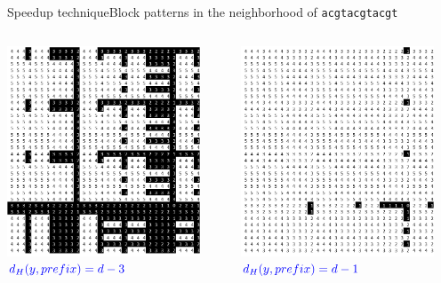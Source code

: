 \documentclass[pdf,xcolor={dvipsnames}]{beamer}
\begin{document}
\begin{frame}{Speedup technique}{Block patterns in the neighborhood of \texttt{acgtacgtacgt}}
\begin{columns}
\begin{column}{0.3\textwidth}
				\includegraphics[width=0.9\textwidth]{img/3.png}\\ $\color{blue}d_H(y,prefix) = d-3$\\\ \\
			\end{column}
			\begin{column}{0.3\textwidth}
				\centering
				\includegraphics[width=0.9\textwidth]{img/1.png}\\ $\color{blue}d_H(y,prefix) = d-1$\\\ \\

\end{column}
\end{columns}
\end{frame}
\end{document}
